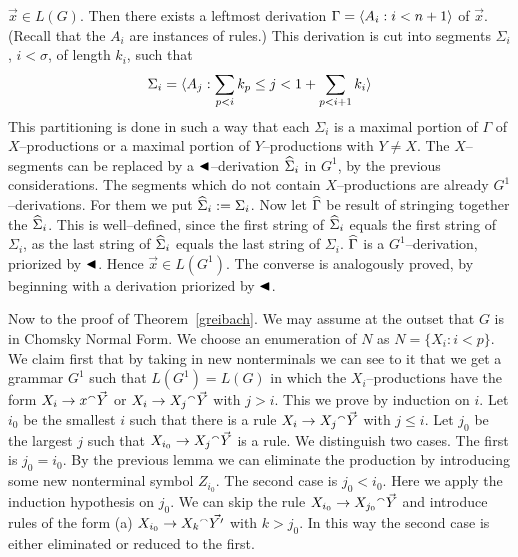 $\vec{x} \in L(G)$. Then there exists a leftmost derivation
$\Gamma = \langle A_i : i < n+1\rangle$ of $\vec{x}$. (Recall that 
the $A_i$ are instances of rules.) This derivation is cut into 
segments $\Sigma_i$, $i < \sigma$, of length $k_i$, such that
\begin{equation}
\Sigma_i = \langle A_j :
\sum_{p < i} k_p \leq j  < 1 + \sum_{p < i+1} k_i \rangle
\end{equation}
This partitioning is done in such a way that
each $\Sigma_i$ is a maximal portion of $\Gamma$ of
$X$--productions or a maximal portion of $Y$--productions
with $Y \neq X$. The $X$--segments can be replaced by a
$\blacktriangleleft$--derivation $\widehat{\Sigma}_i$ in $G^1$, by the previous
considerations. The segments which do not contain $X$--productions
are already $G^1$--derivations.  For them we put
$\widehat{\Sigma}_i := \Sigma_i$. Now let $\widehat{\Gamma}$ be 
result of stringing together the $\widehat{\Sigma}_i$. This is 
well--defined, since the first string of $\widehat{\Sigma}_i$ 
equals the first string of $\Sigma_i$, as the last string 
of $\widehat{\Sigma}_i$ equals the last string of
$\Sigma_i$. $\widehat{\Gamma}$ is a $G^1$--derivation,
priorized by $\blacktriangleleft$. Hence $\vec{x} \in L(G^1)$.
The converse is analogously proved, by beginning with a
derivation priorized by $\blacktriangleleft$.
\proofend

Now to the proof of Theorem~\ref{greibach}. We may assume at the
outset that $G$ is in Chomsky Normal Form. We choose an
enumeration of $N$ as $N = \{X_i : i < p\}$. We claim first that
by taking in new nonterminals we can see to it that we get a
grammar $G^1$ such that $L(G^1) = L(G)$ in which the
$X_i$--productions have the form $X_i \rightarrow x {^{\smallfrown}} \vec{Y}$
or $X_i \rightarrow X_j {^{\smallfrown}} \vec{Y}$ with $j > i$. This we prove by
induction on $i$. Let $i_0$ be the smallest $i$ such that
there is a rule $X_i \rightarrow X_j {^{\smallfrown}} \vec{Y}$ with $j \leq i$.
Let $j_0$ be the largest $j$ such that $X_{i_0} \pf X_j \conc %
\vec{Y}$ is a rule. We distinguish two cases. The first is
$j_0 = i_0$. By the previous lemma we can eliminate the
production by introducing some new nonterminal symbol $Z_{i_0}$.
The second case is $j_0 < i_0$. Here we apply the induction
hypothesis on $j_0$. We can skip the rule $X_{i_0} \pf X_{j_0} %
\conc \vec{Y}$ and introduce rules of the form (a) $X_{i_0} \pf %
X_k \conc \vec{Y'}$ with $k > j_0$. In this way the second case
is either eliminated or reduced to the first.

